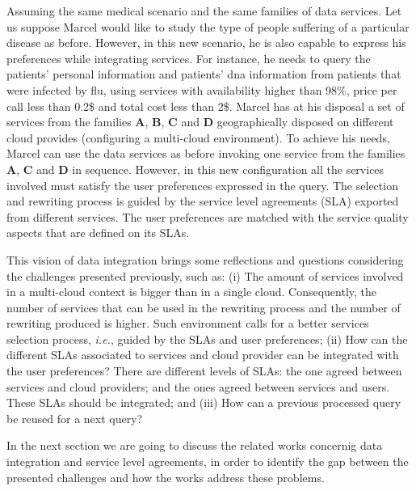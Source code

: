 Assuming the same medical scenario and the same families of data services.
Let us suppose Marcel would like to study the type of people suffering of a
particular disease as before. However, in this new scenario, he is also capable
to express his preferences while integrating services. For instance, he needs to
query the patients' personal information and patients' dna information from
patients that were infected by flu, using services with availability higher than
98\%, price per call less than 0.2\$ and total cost less than 2\$. Marcel has at his disposal a set of services from the families \textbf{A}, \textbf{B}, \textbf{C} and \textbf{D} geographically disposed on different cloud provides (configuring a multi-cloud environment).
To achieve his needs, Marcel can use the data services as before invoking one
service from the families \textbf{A}, \textbf{C} and \textbf{D} in sequence.
However, in this new configuration all the services involved must satisfy the
user preferences expressed in the query. The selection and rewriting process is
guided by the service level agreements (SLA) exported from different services.
The user preferences are matched with the service quality aspects that are
defined on its SLAs.     

This vision of data integration brings some reflections and questions
considering the challenges presented previously, such as:
(i) The amount of services involved in a multi-cloud context is bigger than in a
single cloud. Consequently, the number of services that can be used in the
rewriting process and the number of rewriting produced is higher. Such
environment calls for a better services selection process, \textit{i.e.}, guided
by the SLAs and user preferences; (ii) How can the different SLAs associated to
services and cloud provider can be integrated with the user preferences? There
are different levels of SLAs: the one agreed between services and cloud
providers; and the ones agreed between services and users. These SLAs should be
integrated; and (iii) How can a previous processed query be reused for a next query?

In the next section we are going to discuss the related works concernig data
integration and service level agreements, in order to identify the gap between
the presented challenges and how the works address these problems.

